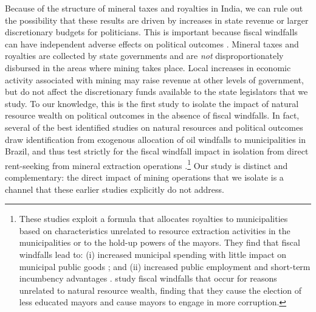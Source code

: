 \documentclass[12pt,letterpaper]{article}
\begin{document}
Because of the structure of mineral taxes and royalties in India, we
can rule out the possibility that these results are driven by
increases in state revenue or larger discretionary budgets for
politicians. This is important because fiscal windfalls can have
independent adverse effects on political outcomes
\cite{Robinson2006,Brollo2009,Martinez2015}. Mineral taxes and
royalties are collected by state governments and are \textit{not}
disproportionately disbursed in the areas where mining takes
place. Local increases in economic activity associated with mining may
raise revenue at other levels of government, but do not affect the
discretionary funds available to the state legislators that we
study. To our knowledge, this is the first study to isolate the impact
of natural resource wealth on political outcomes in the absence of
fiscal windfalls. In fact, several of the best identified studies on
natural resources and political outcomes draw identification from
exogenous allocation of oil windfalls to municipalities in Brazil, and
thus test strictly for the fiscal windfall impact in isolation from
direct rent-seeking from mineral extraction operations
\cite{Caselli2011,Monteiro}.\footnote{These studies exploit a formula
  that allocates royalties to municipalities based on characteristics
  unrelated to resource extraction activities in the municipalities or
  to the hold-up powers of the mayors.  They find that fiscal
  windfalls lead to: (i) increased municipal spending with little
  impact on municipal public goods \cite{Caselli2011}; and (ii)
  increased public employment and short-term incumbency advantages
  \cite{Monteiro}.  study fiscal windfalls that
  occur for reasons unrelated to natural resource wealth, finding that
  they cause the election of less educated mayors and cause mayors to
  engage in more corruption.}  Our study is distinct and
complementary: the direct impact of mining operations that we isolate
is a channel that these earlier studies explicitly do not address.
\end{document}
